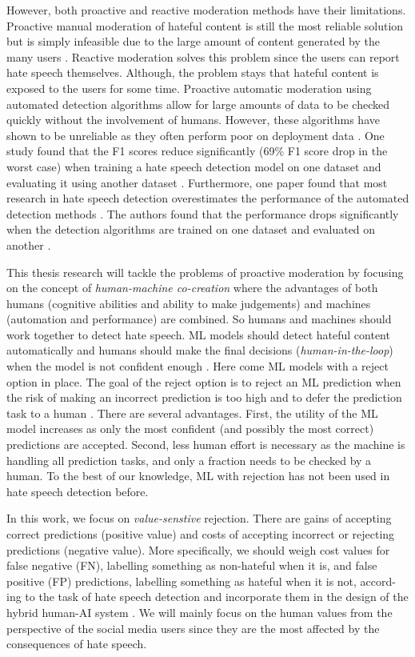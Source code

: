 However, both proactive and reactive moderation methods have their limitations. Proactive manual moderation of hateful content is still the most reliable solution but is simply infeasible due to the large amount of content generated by the many users \citep{balayn2021automatic}. Reactive moderation solves this problem since the users can report hate speech themselves. Although, the problem stays that hateful content is exposed to the users for some time. Proactive automatic moderation using automated detection algorithms allow for large amounts of data to be checked quickly without the involvement of humans. However, these algorithms have shown to be unreliable as they often perform poor on deployment data \citep{balayn2021automatic, grondahl2018all}. One study found that the F1 scores reduce significantly (69\% F1 score drop in the worst case) when training a hate speech detection model on one dataset and evaluating it using another dataset \citep{grondahl2018all}. Furthermore, one paper found that most research in hate speech detection overestimates the performance of the automated detection methods \citep{arango2019hate}. The authors found that the performance drops significantly when the detection algorithms are trained on one dataset and evaluated on another \citep{arango2019hate}.

This thesis research will tackle the problems of proactive moderation by focusing on the concept of \textit{human-machine co-creation} \citep{woo2020future} where the advantages of both humans (cognitive abilities and ability to make judgements) and machines (automation and performance) are combined. So humans and machines should work together to detect hate speech. ML models should detect hateful content automatically and humans should make the final decisions (\textit{human-in-the-loop}) when the model is not confident enough \citep{woo2020future}. Here come ML models with a reject option in place. The goal of the reject option is to reject an ML prediction when the risk of making an incorrect prediction is too high and to defer the prediction task to a human \citep{hendrickx2021machine}. There are several advantages. First, the utility of the ML model increases as only the most confident (and possibly the most correct) predictions are accepted. Second, less human effort is necessary as the machine is handling all prediction tasks, and only a fraction needs to be checked by a human. To the best of our knowledge, ML with rejection has not been used in hate speech detection before.

In this work, we focus on \textit{value-senstive} rejection. There are gains of accepting correct predictions (positive value) and costs of accepting incorrect or rejecting predictions (negative value). More
specifically, we should weigh cost values for false negative (FN), labelling something as non-hateful when it is, and false positive (FP) predictions, labelling something as hateful when it is not, accord-
ing to the task of hate speech detection and incorporate them in the design of the hybrid human-AI system  \citep{sayin2021science}. We will mainly focus on the human values from the perspective of the social media users since they are the most affected by the consequences of hate speech.

